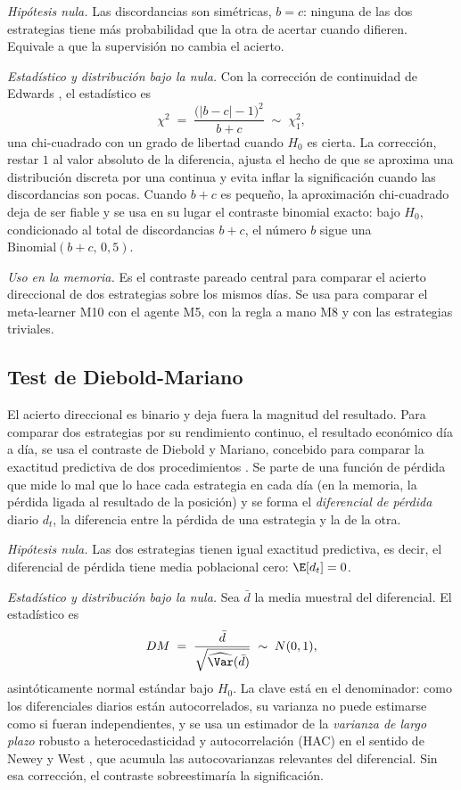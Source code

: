 \emph{Hipótesis nula.} Las discordancias son simétricas, $b = c$: ninguna de las dos estrategias tiene más probabilidad que la otra de acertar cuando difieren. Equivale a que la supervisión no cambia el acierto.

\emph{Estadístico y distribución bajo la nula.} Con la corrección de continuidad de Edwards \cite{edwards1948}, el estadístico es
\[
\chi^2 \;=\; \frac{\big(|b - c| - 1\big)^2}{b + c} \;\sim\; \chi^2_1,
\]
una chi-cuadrado con un grado de libertad cuando $H_0$ es cierta. La corrección, restar $1$ al valor absoluto de la diferencia, ajusta el hecho de que se aproxima una distribución discreta por una continua y evita inflar la significación cuando las discordancias son pocas. Cuando $b + c$ es pequeño, la aproximación chi-cuadrado deja de ser fiable y se usa en su lugar el contraste binomial exacto: bajo $H_0$, condicionado al total de discordancias $b+c$, el número $b$ sigue una $\mathrm{Binomial}(b+c,\, 0{,}5)$.

\emph{Uso en la memoria.} Es el contraste pareado central para comparar el acierto direccional de dos estrategias sobre los mismos días. Se usa para comparar el meta-learner M10 con el agente M5, con la regla a mano M8 y con las estrategias triviales.

\subsection{Test de Diebold-Mariano}
\label{sec:tests-dm}

El acierto direccional es binario y deja fuera la magnitud del resultado. Para comparar dos estrategias por su rendimiento continuo, el resultado económico día a día, se usa el contraste de Diebold y Mariano, concebido para comparar la exactitud predictiva de dos procedimientos \cite{diebold1995}. Se parte de una función de pérdida que mide lo mal que lo hace cada estrategia en cada día (en la memoria, la pérdida ligada al resultado de la posición) y se forma el \emph{diferencial de pérdida} diario $d_t$, la diferencia entre la pérdida de una estrategia y la de la otra.

\emph{Hipótesis nula.} Las dos estrategias tienen igual exactitud predictiva, es decir, el diferencial de pérdida tiene media poblacional cero: $\E[d_t] = 0$.

\emph{Estadístico y distribución bajo la nula.} Sea $\bar d$ la media muestral del diferencial. El estadístico es
\[
DM \;=\; \frac{\bar d}{\sqrt{\widehat{\Var}(\bar d)}} \;\sim\; N(0, 1),
\]
asintóticamente normal estándar bajo $H_0$. La clave está en el denominador: como los diferenciales diarios están autocorrelados, su varianza no puede estimarse como si fueran independientes, y se usa un estimador de la \emph{varianza de largo plazo} robusto a heterocedasticidad y autocorrelación (HAC) en el sentido de Newey y West \cite{newey1987}, que acumula las autocovarianzas relevantes del diferencial. Sin esa corrección, el contraste sobreestimaría la significación.

